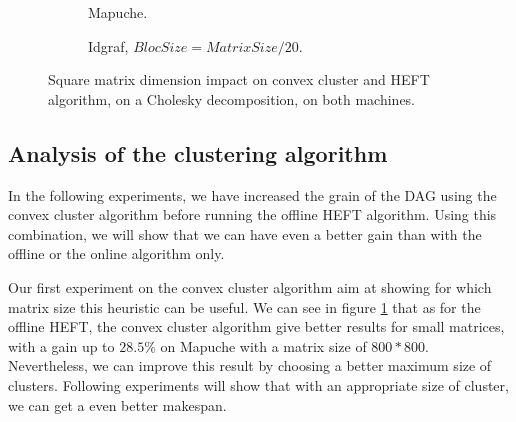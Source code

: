 \documentclass[10pt, conference, compsocconf,pdftex,dvipsnames]{IEEEtran}
\begin{document}
\begin{figure}[t!]
    \centering
    \begin{subfigure}{0.4\textwidth}
        \hspace{-20pt}
        \scalebox{0.6}{
            
        }
        \caption{Mapuche.}
        \label{fig:MatMapuche}
    \end{subfigure}
    \hspace{15pt}
    \begin{subfigure}{0.55\textwidth}
        \scalebox{0.6}{
            
        }
        \caption{Idgraf, $BlocSize=MatrixSize/20$.}
        \label{fig:MatIdgraf}
    \end{subfigure}

    \caption{Square matrix dimension impact on convex cluster and HEFT
    algorithm, on a Cholesky decomposition, on both machines.}
    \label{fig:Mat}
\end{figure}


\subsection{Analysis of the clustering algorithm}
\label{sec:exp-exp-clust}

In the following experiments, we have increased the grain of the DAG using the
convex cluster algorithm before running the offline HEFT algorithm. Using this
combination, we will show that we can have even a better gain than with the
offline or the online algorithm only.

Our first experiment on the convex cluster algorithm aim at showing for which
matrix size this heuristic can be useful. We can see in figure
\ref{fig:MatMapuche} that as for the offline HEFT, the convex cluster
algorithm give better results for small matrices, with a gain up to $28.5\%$
on Mapuche with a matrix size of $800*800$. Nevertheless, we can improve this
result by choosing a better maximum size of clusters. Following experiments
will show that with an appropriate size of cluster, we can get a even better
makespan.
\end{document}
